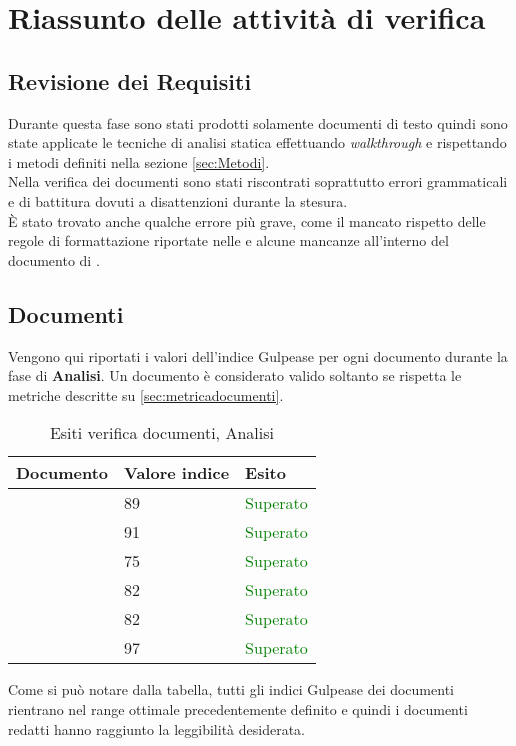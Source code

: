 \section{Riassunto delle attività di verifica}{
\subsection{Revisione dei Requisiti}{

Durante questa fase sono stati prodotti solamente documenti di testo quindi sono state applicate le tecniche di analisi statica effettuando \textit{walkthrough} e rispettando i metodi definiti nella sezione \ref{sec:Metodi}.\\
Nella verifica dei documenti sono stati riscontrati soprattutto errori grammaticali e di battitura dovuti a disattenzioni durante la stesura.\\
È stato trovato anche qualche errore più grave, come il mancato rispetto delle regole di formattazione riportate nelle \NormeDiProgetto e alcune mancanze all'interno del documento di \AnalisiDeiRequisiti.\\
}
\subsection{Documenti}{
Vengono qui riportati i valori dell’indice Gulpease per ogni documento durante la fase di \textbf{Analisi}. Un documento è considerato valido soltanto se rispetta le metriche descritte su \ref{sec:metricadocumenti}.

\begin{table}[H]
	\centering
	\begin{tabular}{p{}p{}
			p{}}
		\toprule Documento & Valore indice & Esito \\
		\midrule
		\PianoDiProgetto & 89 & \textcolor{green}{Superato} \\
		\AnalisiDeiRequisiti & 91 & \textcolor{green}{Superato} \\
		\NormeDiProgetto & 75 & \textcolor{green}{Superato} \\
		\PianoDiQualifica & 82 & \textcolor{green}{Superato} \\
		\StudioDiFattibilita & 82 & \textcolor{green}{Superato} \\
		\Glossario & 97 & \textcolor{green}{Superato} \\
		\bottomrule
	\end{tabular}
	\label{tab:costorequisiti}
	\caption{Esiti verifica documenti, Analisi}
\end{table}

Come si può notare dalla tabella, tutti gli indici Gulpease dei documenti rientrano nel range ottimale precedentemente definito e quindi i documenti redatti hanno raggiunto la leggibilità desiderata.
}
}
